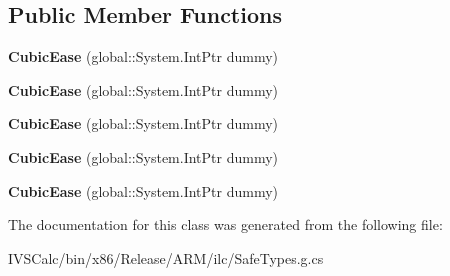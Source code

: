 \subsection*{Public Member Functions}
\begin{DoxyCompactItemize}
\item 
\mbox{\label{class_windows_1_1_u_i_1_1_xaml_1_1_media_1_1_animation_1_1_cubic_ease_a0b3dc908a21881cd973a9cc8a26b6c6e}} 
{\bfseries Cubic\+Ease} (global\+::\+System.\+Int\+Ptr dummy)
\item 
\mbox{\label{class_windows_1_1_u_i_1_1_xaml_1_1_media_1_1_animation_1_1_cubic_ease_a0b3dc908a21881cd973a9cc8a26b6c6e}} 
{\bfseries Cubic\+Ease} (global\+::\+System.\+Int\+Ptr dummy)
\item 
\mbox{\label{class_windows_1_1_u_i_1_1_xaml_1_1_media_1_1_animation_1_1_cubic_ease_a0b3dc908a21881cd973a9cc8a26b6c6e}} 
{\bfseries Cubic\+Ease} (global\+::\+System.\+Int\+Ptr dummy)
\item 
\mbox{\label{class_windows_1_1_u_i_1_1_xaml_1_1_media_1_1_animation_1_1_cubic_ease_a0b3dc908a21881cd973a9cc8a26b6c6e}} 
{\bfseries Cubic\+Ease} (global\+::\+System.\+Int\+Ptr dummy)
\item 
\mbox{\label{class_windows_1_1_u_i_1_1_xaml_1_1_media_1_1_animation_1_1_cubic_ease_a0b3dc908a21881cd973a9cc8a26b6c6e}} 
{\bfseries Cubic\+Ease} (global\+::\+System.\+Int\+Ptr dummy)
\end{DoxyCompactItemize}


The documentation for this class was generated from the following file\+:\begin{DoxyCompactItemize}
\item 
I\+V\+S\+Calc/bin/x86/\+Release/\+A\+R\+M/ilc/Safe\+Types.\+g.\+cs\end{DoxyCompactItemize}

